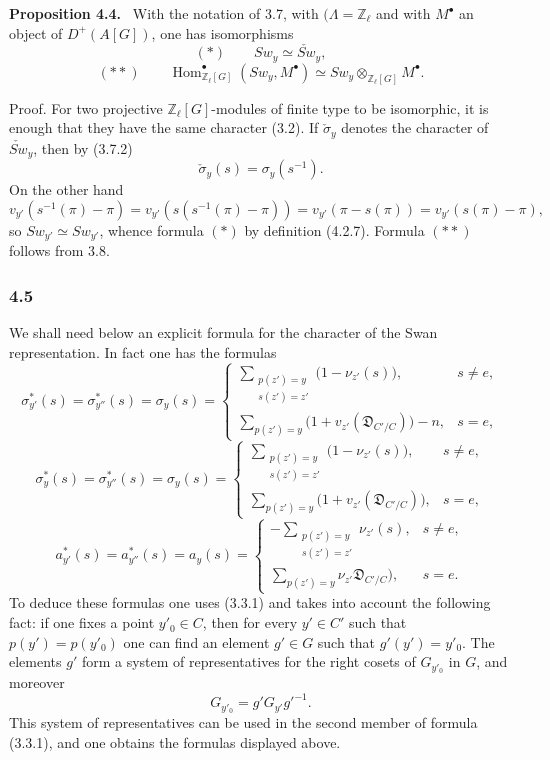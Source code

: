 \documentclass[11pt]{article}
\newenvironment{statement}[1]{\par\medskip\noindent\textbf{#1.}\ }{\par\medskip}
\DeclareMathOperator{\Hom}{Hom}
\providecommand{\Hom}{\operatorname{Hom}}
\providecommand{\Hom}{\operatorname{Hom}}
\begin{document}
\begin{statement}{Proposition 4.4}
With the notation of 3.7, with $(\Lambda=\mathbb Z_\ell$ and with $M^\bullet$ an object of $D^+(A[G])$, one has isomorphisms
\[
(*)\qquad Sw_y\simeq \check{Sw}_y,
\]
\[
(**)\qquad
\Hom^\bullet_{\mathbb Z_\ell[G]}(Sw_y,M^\bullet)
\simeq Sw_y\otimes_{\mathbb Z_\ell[G]}M^\bullet.
\]
\end{statement}

Proof. For two projective $\mathbb Z_\ell[G]$-modules of finite type to be isomorphic, it is enough that they have the same character (3.2). If $\check\sigma_y$ denotes the character of $\check{Sw}_y$, then by (3.7.2)
\[
\check\sigma_y(s)=\sigma_y(s^{-1}).
\]
On the other hand
\[
v_{y'}(s^{-1}(\pi)-\pi)
=v_{y'}(s(s^{-1}(\pi)-\pi))
=v_{y'}(\pi-s(\pi))
=v_{y'}(s(\pi)-\pi),
\]
so $Sw_{y'}\simeq{Sw}_{y'}$, whence formula $(*)$ by definition (4.2.7). Formula $(**)$ follows from 3.8.

\subsubsection*{4.5}

We shall need below an explicit formula for the character of the Swan representation. In fact one has the formulas
\[
\sigma^{*}_{y'}(s)=\sigma^{*}_{y''}(s)=\sigma_y(s)=
\begin{cases}
\displaystyle\sum_{\substack{p(z')=y\\s(z')=z'}}\bigl(1-\nu_{z'}(s)\bigr),& s\ne e,\\[0.8em]
\displaystyle\sum_{p(z')=y}\bigl(1+v_{z'}(\mathfrak D_{C'/C})\bigr)-n,& s=e,
\end{cases}
\tag{4.5.1}
\]
\[
\sigma^{*}_{y}(s)=\sigma^{*}_{y''}(s)=\sigma_y(s)=
\begin{cases}
\displaystyle\sum_{\substack{p(z')=y\\s(z')=z'}}\bigl(1-\nu_{z'}(s)\bigr),& s\ne e,\\[0.8em]
\displaystyle\sum_{p(z')=y}\bigl(1+v_{z'}(\mathfrak D_{C'/C})\bigr),& s=e,
\end{cases}
\tag{4.5.2}
\]
\[
a^{*}_{y'}(s)=a^{*}_{y''}(s)=a_y(s)=
\begin{cases}
\displaystyle-\sum_{\substack{p(z')=y\\s(z')=z'}}\nu_{z'}(s),& s\ne e,\\[0.8em]
\displaystyle\sum_{p(z')=y}\nu_{z'}\mathfrak D_{C'/C}),& s=e.
\end{cases}
\tag{4.5.3}
\]
To deduce these formulas one uses (3.3.1) and takes into account the following fact: if one fixes a point $y'_0\in C$, then for every $y'\in C'$ such that $p(y')=p(y'_0)$ one can find an element $g'\in G$ such that $g'(y')=y'_0$. The elements $g'$ form a system of representatives for the right cosets of $G_{y'_0}$ in $G$, and moreover
\[
G_{y'_0}=g'G_{y'}g'^{-1}.
\]
This system of representatives can be used in the second member of formula (3.3.1), and one obtains the formulas displayed above.
\end{document}
